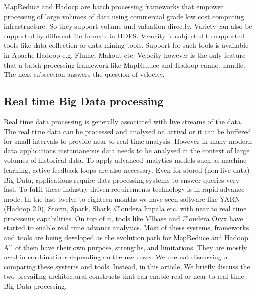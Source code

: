 MapReduce and Hadoop are batch processing frameworks that empower processing of large volumes of data using commercial grade low cost computing infrastructure. So they support volume and valuation directly. Variety can also be supported by different file formats in HDFS. Veracity is subjected to supported tools like data collection or data mining tools. Support for such tools is available in Apache Hadoop e.g. Flume, Mahout etc. Velocity however is the only feature that a batch processing framework like MapReduce and Hadoop cannot handle. The next subsection answers the question of velocity.

\subsection{ Real time Big Data processing }
Real time data processing is generally associated with live streams of the data. The real time data can be processed and analysed on arrival or it can be buffered for small intervals to provide near to real time analysis. However in many modern data applications instantaneous data needs to be analysed in the context of large volumes of historical data. To apply advanced analytics models such as machine learning, active feedback loops are also necessary.  Even for stored (non live data) Big Data, applications require data processing systems to answer queries very fast. To fulfil these industry-driven requirements technology is in rapid advance mode. In the last twelve to eighteen months we have seen software like YARN (Hadoop 2.0), Storm, Spark, Shark, Cloudera Impala etc. with near to real time processing capabilities. On top of it, tools like Mlbase and Cloudera Oryx have started to enable real time advance analytics. Most of these systems, frameworks and tools are being developed as the evolution path for MapReduce and Hadoop. All of them have their own purpose, strengths, and limitations. They are mostly used in combinations depending on the use cases. We are not discussing or comparing these systems and tools. Instead, in this article, We briefly discuss the two prevailing architectural constructs that can enable real or near to real time Big Data processing.

